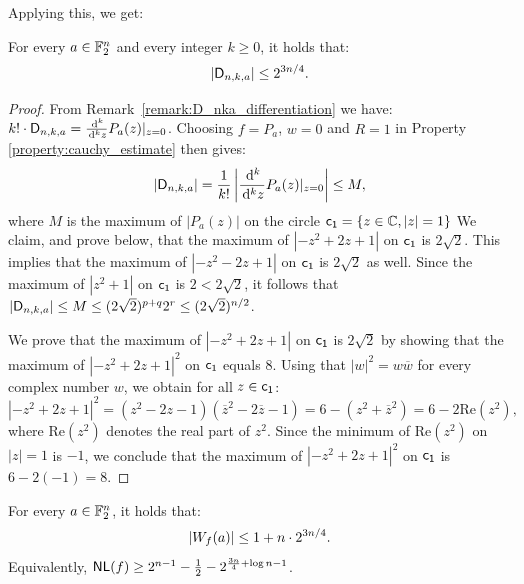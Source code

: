 \documentclass[11pt]{llncs}
\begin{document}

Applying this, we get:

\begin{theorem}\label{theorem:bound_D_nka}
    For every $a\in\mathbb{F}_2^n$ and every integer $k\geq 0$, it holds that:
    \[
        |\mathsf{D}_{n,k,a}|\leq 2^{3n/4}.
    \]
\end{theorem}

\begin{proof}
    From Remark~\ref{remark:D_nka_differentiation} we have: $k!\cdot\mathsf{D}_{n,k,a}=\frac{\,\mathrm d^k}{\,\mathrm d^k z}P_a(z)\vert_{z=0}$. Choosing $f=P_a$, $w=0$ and $R=1$ in Property \ref{property:cauchy_estimate} then gives:
    \[
        |\mathsf{D}_{n,k,a}|=\frac{1}{k!}\left|\frac{\,\mathrm d^k}{\,\mathrm d^k z}P_a(z)\vert_{z=0}\right|\leq M,
    \]
    where $M$ is the maximum of $|P_a(z)|$ on the circle %
    $\mathsf{c_1}=\{ z \in \mathbb{C},  |z|=1  \}$
    We claim, and prove below, that the maximum of $\left|-z^2+2z+1\right|$ on $\mathsf{c_1}$ is $2\sqrt 2$. 
    This implies that the maximum of $\left|-z^2-2z+1\right|$ on $\mathsf{c_1}$ is $2\sqrt 2$ as well. 
    Since the maximum of $\left|z^2+1\right|$ on $\mathsf{c_1}$ is $2<2\sqrt 2$, it follows that $|\mathsf{D}_{n,k,a}|\leq M\leq (2\sqrt 2)^{p+q}2^r\leq (2\sqrt 2)^{n/2}$.

	We prove that the maximum of $\left|-z^2+2z+1\right|$ on $\mathsf{c_1}$ is $2\sqrt 2$ by showing that the maximum of $\left|-z^2+2z+1\right|^2$ on $\mathsf{c_1}$ equals $8$.
    Using that $|w|^2=w\overline w$ for every complex number $w$, we obtain for all $z\in \mathsf{c_1}$:
    \[
        \left|-z^2+2z+1\right|^2=\left(z^2-2z-1\right)\left(\overline z^2-2\overline z-1\right)=6-\left(z^2+\overline z^2\right)=6-2\mathrm{Re}\left(z^2\right),
    \]
    where $\mathrm{Re}\left(z^2\right)$ denotes the real part of $z^2$. Since the minimum of $\mathrm{Re}\left(z^2\right)$ on $|z|=1$ is $-1$, we conclude that the maximum of $\left|-z^2+2z+1\right|^2$ on $\mathsf{c_1}$ is $6-2(-1)=8$. 
     
    
\end{proof}

\begin{Corollary}\label{cor:bound_walsh_cauchy}
    For every $a\in\mathbb{F}_2^n$, it holds that:
    \[
        |W_{f}(a)|\leq 1+n\cdot 2^{3n/4}.
    \]
Equivalently, 
$\mathsf{NL}(f)\ge 2^{n-1} - \frac{1}{2} -2^{\frac{3n}{4} + \log n -1}$.
\end{Corollary}
\end{document}

